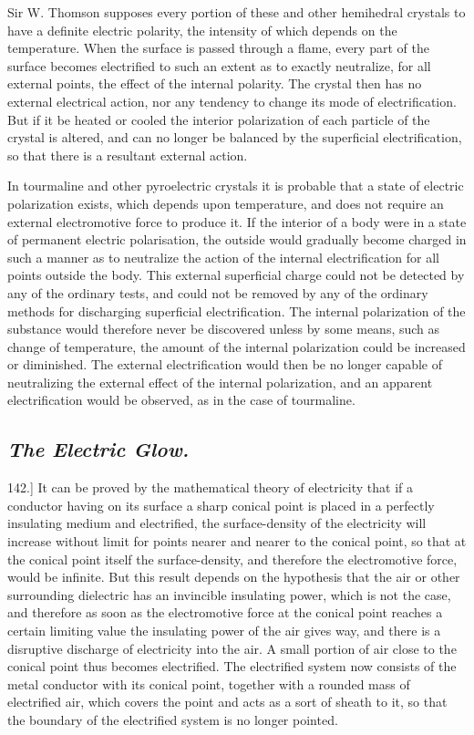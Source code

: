 \documentclass[12pt,oneside]{book}[2021/10/04]
\newcommand{\Heading}{\centering\normalfont}
\newcommand{\Subsection}[1]{\subsection*{\normalsize\Heading\itshape #1}}
\newcommand{\Runhead}[1]{\fancyhead[C]{\iffloatpage{}{\small#1}}}
\newcommand{\article}[1]{\phantomsection \label{art:#1}{#1.]}}
\newcommand{\¬}{\hphantom{0}}
\begin{document}
Sir W. Thomson supposes every portion of these and other hemihedral
crystals to have a definite electric polarity, the intensity
of which depends on the temperature. When the surface is passed
through a flame, every part of the surface becomes electrified to
such an extent as to exactly neutralize, for all external points,
the effect of the internal polarity. The crystal then has no external
electrical action, nor any tendency to change its mode of
electrification. But if it be heated or cooled the interior polarization
of each particle of the crystal is altered, and can no longer
be balanced by the superficial electrification, so that there is a
resultant external action.
\Runhead{PYRO-ELECTRIC PHENOMENA.}

In tourmaline and other pyroelectric crystals it is probable
that a state of electric polarization exists, which depends upon
temperature, and does not require an external electromotive force
to produce it. If the interior of a body were in a state of
permanent electric polarisation, the outside would gradually become
charged in such a manner as to neutralize the action of the internal
electrification for all points outside the body. This external superficial
charge could not be detected by any of the ordinary tests,
and could not be removed by any of the ordinary methods for
discharging superficial electrification. The internal polarization
of the substance would therefore never be discovered unless by
some means, such as change of temperature, the amount of the
internal polarization could be increased or diminished. The external
electrification would then be no longer capable of neutralizing
the external effect of the internal polarization, and an apparent
electrification would be observed, as in the case of tourmaline.

\Subsection{The Electric Glow.}
\Runhead{THE ELECTRIC GLOW.}

\article{142} It can be proved by the mathematical theory of electricity
that if a conductor having on its surface a sharp conical point
is placed in a perfectly insulating medium and electrified, the
surface-density of the electricity will increase without limit for
points nearer and nearer to the conical point, so that at the conical
point itself the surface-density, and therefore the electromotive
force, would be infinite. But this result depends on the hypothesis
that the air or other surrounding dielectric has an invincible
insulating power, which is not the case, and therefore as soon
as the electromotive force at the conical point reaches a certain
limiting value the insulating power of the air gives way, and
there is a disruptive discharge of electricity into the air. A small
portion of air close to the conical point thus becomes electrified.
The electrified system now consists of the metal conductor with
its conical point, together with a rounded mass of electrified air,
which covers the point and acts as a sort of sheath to it, so that
the boundary of the electrified system is no longer pointed.
\end{document}
